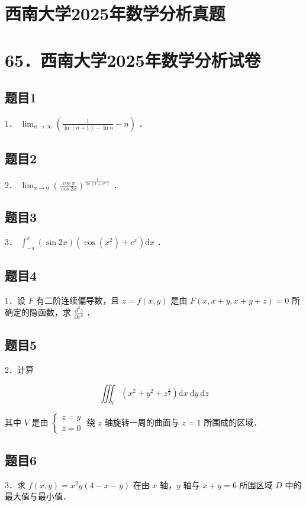 \documentclass{article}
\begin{document}
\section*{西南大学2025年数学分析真题}
\section*{65．西南大学2025年数学分析试卷}

\subsection{题目1}
1． \(\lim _{n \rightarrow \infty}\left(\frac{1}{\ln (n+1)-\ln n}-n\right)\) ．

\subsection{题目2}
2． \(\lim _{x \rightarrow 0}\left(\frac{\cos x}{\cos 2 x}\right)^{\frac{1}{\ln \left(1+x^{2}\right)}}\) ．

\subsection{题目3}
3． \(\int_{-\pi}^{\pi}(\sin 2 x)\left(\cos \left(x^{2}\right)+e^{x}\right) \mathrm{d} x\) ．

\subsection{题目4}
1．设 \(F\) 有二阶连续偏导数，且 \(z=f(x, y)\) 是由 \(F(x, x+y, x+y+z)=0\) 所确定的隐函数，求 \(\frac{\partial^{2} z}{\partial x^{2}}\) ．

\subsection{题目5}
2．计算

\[
\iiint_{V}\left(x^{2}+y^{2}+z^{\frac{1}{2}}\right) \mathrm{d} x \mathrm{~d} y \mathrm{~d} z
\]

其中 \(V\) 是由 \(\left\{\begin{array}{l}z=y \\ z=0\end{array}\right.\) 绕 \(z\) 轴旋转一周的曲面与 \(z=1\) 所围成的区域．

\subsection{题目6}
3．求 \(f(x, y)=x^{2} y(4-x-y)\) 在由 \(x\) 轴，\(y\) 轴与 \(x+y=6\) 所围区域 \(D\) 中的最大值与最小值．
\end{document}
